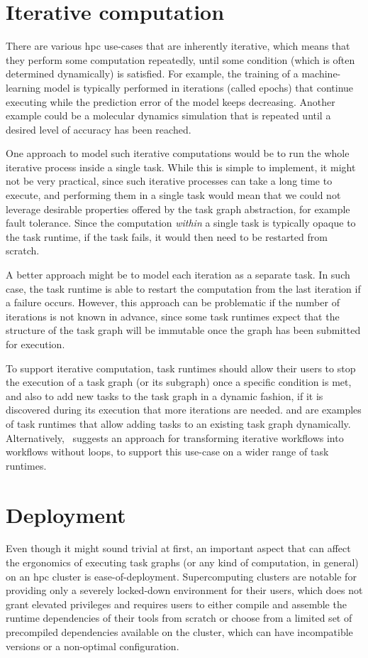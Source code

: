 \section{Iterative computation}
There are various \gls{hpc} use-cases that are inherently iterative, which means
that they perform some computation repeatedly, until some condition (which is often determined
dynamically) is satisfied. For example, the training of a machine-learning model is typically
performed in iterations (called epochs) that continue executing while the prediction error of the
model keeps decreasing. Another example could be a molecular dynamics simulation that is repeated
until a desired level of accuracy has been reached.

One approach to model such iterative computations would be to run the whole iterative process
inside a single task. While this is simple to implement, it might not be very practical, since such
iterative processes can take a long time to execute, and performing them in a single task would
mean that we could not leverage desirable properties offered by the task graph abstraction, for
example fault tolerance. Since the computation \emph{within} a single task is
typically opaque to the task runtime, if the task fails, it would then need to be restarted from
scratch.

A better approach might be to model each iteration as a separate task. In such case, the task
runtime is able to restart the computation from the last iteration if a failure occurs. However,
this approach can be problematic if the number of iterations is not known in advance, since some
task runtimes expect that the structure of the task graph will be immutable once the graph has been
submitted for execution.

To support iterative computation, task runtimes should allow their users to stop the execution of a
task graph (or its subgraph) once a specific condition is met, and also to add new tasks to the
task graph in a dynamic fashion, if it is discovered during its execution that more iterations are
needed. \dask{} and \ray{} are examples of task runtimes
that allow adding tasks to an existing task graph dynamically.
Alternatively,~\cite{l-dag} suggests an approach for transforming iterative
workflows into workflows without loops, to support this use-case on a wider range of task runtimes.

\section{Deployment}
\label{challenge:deployment}
Even though it might sound trivial at first, an important aspect that can affect the ergonomics of
executing task graphs (or any kind of computation, in general) on an \gls{hpc}
cluster is ease-of-deployment. Supercomputing clusters are notable for providing only a severely
locked-down environment for their users, which does not grant elevated privileges and requires
users to either compile and assemble the runtime dependencies of their tools from scratch or choose
from a limited set of precompiled dependencies available on the cluster, which can have
incompatible versions or a non-optimal configuration.

